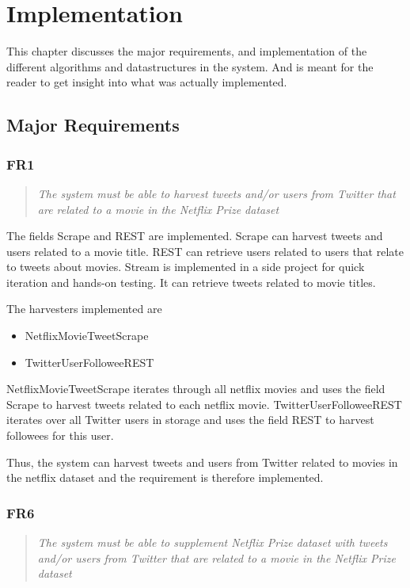 
\chapter{Implementation}

\minitoc

This chapter discusses the major requirements, and implementation of the different algorithms and datastructures in the system. And is meant for the reader to get insight into what was actually implemented.

\clearpage

\section{Major Requirements}\label{impl:Major Requirements}
\subsection{FR1}
\begin{quotation}
\em The system must be able to harvest tweets and/or users from Twitter that are related to a movie in the Netflix Prize dataset %
\end{quotation}

The fields Scrape and REST are implemented. Scrape can harvest tweets and users related to a movie title. REST can retrieve users related to users that relate to tweets about movies. Stream is implemented in a side project for quick iteration and hands-on testing. It can retrieve tweets related to movie titles.

The harvesters implemented are
\begin{itemize}
\item NetflixMovieTweetScrape
\item TwitterUserFolloweeREST
\end{itemize}

NetflixMovieTweetScrape iterates through all netflix movies and uses the field Scrape to harvest tweets related to each netflix movie. TwitterUserFolloweeREST iterates over all Twitter users in storage and uses the field REST to harvest followees for this user.

Thus, the system can harvest tweets and users from Twitter related to movies in the netflix dataset and the requirement is therefore implemented.

\subsection{FR6}\label{subsec:FR6}
\begin{quotation}
\em The system must be able to supplement Netflix Prize dataset with tweets and/or users from Twitter that are related to a movie in the Netflix Prize dataset %
\end{quotation}

